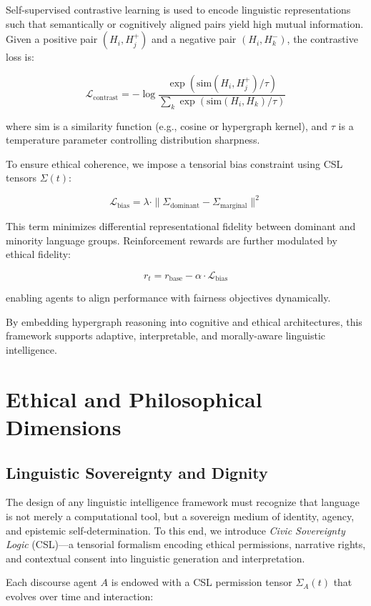 \documentclass{article}
\theoremstyle{plain}
\theoremstyle{claimstyle}
\begin{document}
Self-supervised contrastive learning is used to encode linguistic representations such that semantically or cognitively aligned pairs yield high mutual information. Given a positive pair $(H_i, H_j^+)$ and a negative pair $(H_i, H_k^-)$, the contrastive loss is:

\[
\mathcal{L}_{\text{contrast}} = -\log \frac{\exp(\text{sim}(H_i, H_j^+)/\tau)}{\sum_{k} \exp(\text{sim}(H_i, H_k)/\tau)}
\]

where $\text{sim}$ is a similarity function (e.g., cosine or hypergraph kernel), and $\tau$ is a temperature parameter controlling distribution sharpness.

To ensure ethical coherence, we impose a tensorial bias constraint using CSL tensors $\Sigma(t)$:

\[
\mathcal{L}_{\text{bias}} = \lambda \cdot \|\Sigma_{\text{dominant}} - \Sigma_{\text{marginal}}\|^2
\]

This term minimizes differential representational fidelity between dominant and minority language groups. Reinforcement rewards are further modulated by ethical fidelity:

\[
r_t = r_{\text{base}} - \alpha \cdot \mathcal{L}_{\text{bias}}
\]

enabling agents to align performance with fairness objectives dynamically.

By embedding hypergraph reasoning into cognitive and ethical architectures, this framework supports adaptive, interpretable, and morally-aware linguistic intelligence.

\section{Ethical and Philosophical Dimensions}

\subsection{Linguistic Sovereignty and Dignity}

The design of any linguistic intelligence framework must recognize that language is not merely a computational tool, but a sovereign medium of identity, agency, and epistemic self-determination. To this end, we introduce \textit{Civic Sovereignty Logic} (CSL)—a tensorial formalism encoding ethical permissions, narrative rights, and contextual consent into linguistic generation and interpretation.

Each discourse agent $A$ is endowed with a CSL permission tensor $\Sigma_A(t)$ that evolves over time and interaction:
\end{document}
